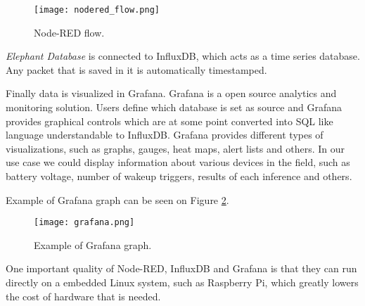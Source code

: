 \begin{figure}[ht]
    \centering
    \texttt{[image: nodered\_flow.png]} 
    \caption{ Node-RED flow.}
    \label{nodered_flow}
\end{figure}

\textit{Elephant Database} is connected to InfluxDB, which acts as a time series database.
Any packet that is saved in it is automatically timestamped.

Finally data is visualized in Grafana. 
Grafana is a open source analytics and monitoring solution.
Users define which database is set as source and Grafana provides graphical controls which are at some point converted into SQL like language understandable to InfluxDB.
Grafana provides different types of visualizations, such as graphs, gauges, heat maps, alert lists and others.
In our use case we could display information about various devices in the field, such as battery voltage, number of wakeup triggers, results of each inference and others.

Example of Grafana graph can be seen on Figure \ref{grafana}.

\begin{figure}[ht]
    \centering
    \texttt{[image: grafana.png]} 
    \caption{ Example of Grafana graph.}
    \label{grafana}
\end{figure}

One important quality of Node-RED, InfluxDB and Grafana is that they can run directly on a embedded Linux system, such as Raspberry Pi, which greatly lowers the cost of hardware that is needed.
